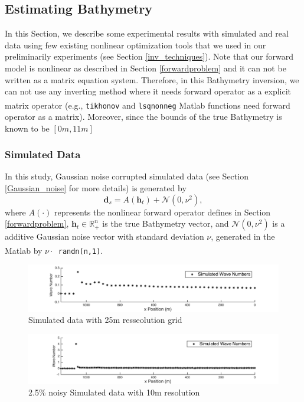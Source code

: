 \subsection{Estimating Bathymetry}

In this Section, we describe some experimental results with simulated and real data using few existing nonlinear optimization tools that we used in our preliminarily experiments (see Section \ref{inv_techniques}). Note that our forward model is nonlinear as described in Section \ref{forwardproblem} and it can not be written as a matrix equation system. Therefore, in this Bathymetry inversion, we can not use any inverting method where it needs forward operator as a explicit matrix operator (e.g., \verb|tikhonov| and  \verb|lsqnonneg|     
 Matlab\textsuperscript{\textregistered} functions need forward operator as a matrix). Moreover, since the bounds of the true Bathymetry is known to be $[0m, 11m]$ 

\subsubsection{Simulated Data}
In this study, Gaussian noise corrupted simulated data (see Section \ref{Gaussian_noise} for more details) is generated by 
\begin{equation}
\mathbf{d}_s = A(\mathbf{h}_t) + \mathcal{N}(0, \nu^2),
\end{equation}
where $A(\cdot)$ represents the nonlinear forward operator defines in Section \ref{forwardproblem}, $\mathbf{h}_t \in \mathbb{R}_+^n$ is the true Bathymetry vector, and $\mathcal{N}(0, \nu^2)$ is a additive Gaussian noise vector with standard deviation $\nu$, generated in the Matlab\textsuperscript{\textregistered} by $\nu \cdot $\verb| randn(n,1)|.



\begin{figure}[H]
\center
\includegraphics[scale=0.6]{img/simulated_data_k25m.png} 
\caption{Simulated data with 25m resseolution grid}
\label{Simulated25m}
\end{figure}

\begin{figure}[H]
\center
\includegraphics[scale=0.6]{img/simulated_data_k10m.png} 
\caption{2.5\% noisy Simulated data with 10m resolution}
\label{Simulated10m}
\end{figure}


